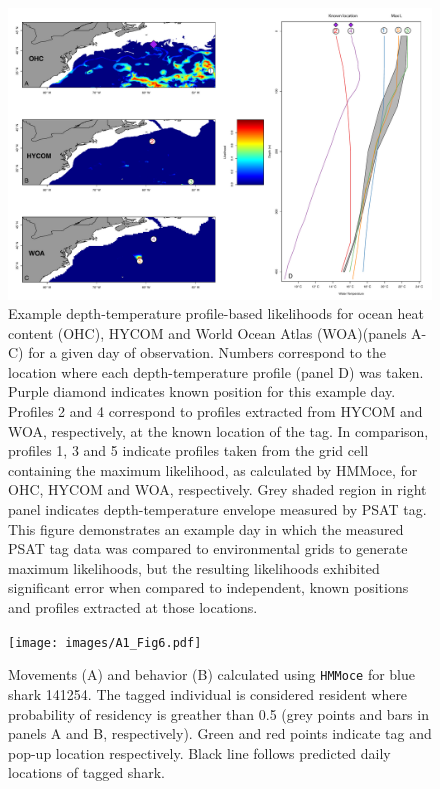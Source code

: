 \clearpage


\begin{landscape}
\begin{figure}[p]
\centering
\includegraphics[width=8in]{images/A1_Fig5.pdf}
\caption[Example depth-temperature profile-based likelihoods]{Example depth-temperature profile-based likelihoods for ocean heat content (OHC), HYCOM and World Ocean Atlas (WOA)(panels A-C) for a given day of observation. Numbers correspond to the location where each depth-temperature profile (panel D) was taken. Purple diamond indicates known position for this example day. Profiles 2 and 4 correspond to profiles extracted from HYCOM and WOA, respectively, at the known location of the tag. In comparison, profiles 1, 3 and 5 indicate profiles taken from the grid cell containing the maximum likelihood, as calculated by HMMoce, for OHC, HYCOM and WOA, respectively. Grey shaded region in right panel indicates depth-temperature envelope measured by PSAT tag. This figure demonstrates an example day in which the measured PSAT tag data was compared to environmental grids to generate maximum likelihoods, but the resulting likelihoods exhibited significant error when compared to independent, known positions and profiles extracted at those locations.}
\label{fig:a1f5}
\end{figure}
\end{landscape}
\clearpage

\begin{figure}[p]
\centering
\texttt{[image: images/A1\_Fig6.pdf]}
\caption[Calculated \texttt{HMMoce} tracks and behavior for blue shark 141254]{Movements (A) and behavior (B) calculated using \texttt{HMMoce} for blue shark 141254. The tagged individual is considered resident where probability of residency is greather than 0.5 (grey points and bars in panels A and B, respectively). Green and red points indicate tag and pop-up location respectively. Black line follows predicted daily locations of tagged shark.}
\label{fig:a1f6}
\end{figure}
\clearpage

